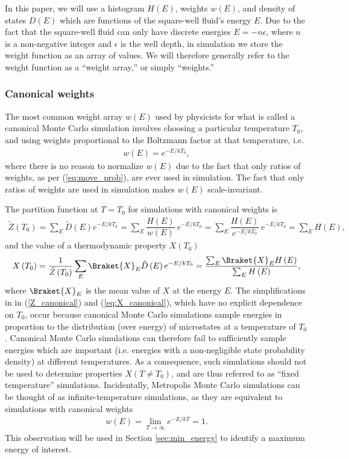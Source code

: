 \documentclass[11pt]{article}
\newcommand{\bk}{\Braket} %
\newcommand{\f}[2]{\dfrac{#1}{#2}} %
\newcommand{\p}[1]{\left(#1\right)} %
\begin{document}
In this paper, we will use a histogram $H\p{E}$, weights $w\p{E}$, and
density of states $D\p{E}$ which are functions of the square-well
fluid's energy $E$. Due to the fact that the square-well fluid can
only have discrete energies $E=-n\epsilon$, where $n$ is a
non-negative integer and $\epsilon$ is the well depth, in simulation
we store the weight function as an array of values. We will therefore
generally refer to the weight function as a ``weight array,'' or
simply ``weights.''

\subsubsection{Canonical weights}
\label{sec:canonical_weights}

The most common weight array $w\p{E}$ used by physicists for what is
called a canonical Monte Carlo simulation involves choosing a
particular temperature $T_0$, and using weights proportional to the
Boltzmann factor at that temperature, i.e.
\begin{align}
  w\p{E}=e^{-E/kT_0},
\end{align}
where there is no reason to normalize $w\p{E}$ due to the fact that
only ratios of weights, as per (\ref{eq:move_prob}), are ever used in
simulation. The fact that only ratios of weights are used in
simulation makes $w\p{E}$ scale-invariant.

The partition function at $T=T_0$ for simulations with canonical
weights is
\begin{align}
  \tilde Z\p{T_0}=\sum_E\tilde D\p{E}e^{-E/kT_0}
  =\sum_E\f{H\p{E}}{w\p{E}}~e^{-E/kT_0}
  =\sum_E\f{H\p{E}}{e^{-E/kT_0}}~e^{-E/kT_0}=\sum_EH\p{E},
  \label{Z_canonical}
\end{align}
and the value of a thermodynamic property $X\p{T_0}$
\begin{align}
  X\p{T_0}=\f1{\tilde Z\p{T_0}}\sum_E\bk{X}_E\tilde D\p{E}e^{-E/kT_0}
  =\f{\sum_E\bk{X}_EH\p{E}}{\sum_EH\p{E}},
  \label{eq:X_canonical}
\end{align}
where $\bk{X}_E$ is the mean value of $X$ at the energy $E$. The
simplifications in in (\ref{Z_canonical}) and (\ref{eq:X_canonical}),
which have no explicit dependence on $T_0$, occur because canonical
Monte Carlo simulations sample energies in proportion to the
distribution (over energy) of microstates at a temperature of $T_0$.
Canonical Monte Carlo simulations can therefore fail to sufficiently
sample energies which are important (i.e. energies with a
non-negligible state probability density) at different
temperatures. As a consequence, such simulations should not be used to
determine properties $X\p{T\ne T_0}$, and are thus referred to as
``fixed temperature'' simulations. Incidentally, Metropolis Monte
Carlo simulations can be thought of as infinite-temperature
simulations, as they are equivalent to simulations with canonical
weights
\begin{align}
  w\p{E}=\lim_{T\to\infty}e^{-E/kT}=1.
  \label{eq:inf_temp_weights}
\end{align}
This observation will be used in Section \ref{sec:min_energy} to
identify a maximum energy of interest.
\end{document}
